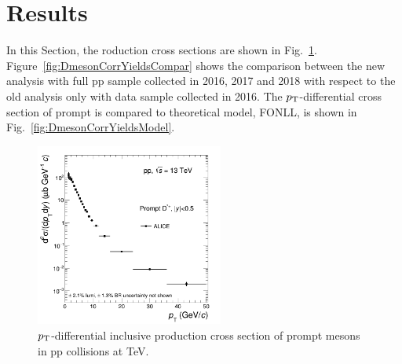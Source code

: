 \section{Results}


In this Section, the \Dstar roduction cross sections are shown in Fig.~\ref{fig:DmesonCorrYields}. Figure~\ref{fig:DmesonCorrYieldsCompar} shows the comparison between the new analysis with full pp sample collected in 2016, 2017 and 2018 with respect to the old analysis only with data sample collected in 2016. The $p_{\rm T}$-differential cross section of prompt \Dstar is compared to theoretical model, FONLL, is shown in Fig.~\ref{fig:DmesonCorrYieldsModel}.


\begin{figure}[tb]
\begin{center}
\includegraphics[width=0.55\textwidth]{figures/Dstar/pp13TeV/cross-setion-pp13TeV.png}
\caption{$p_{\rm T}$-differential inclusive production cross section of prompt \Dstar mesons in pp collisions at  TeV.} 
\label{fig:DmesonCorrYields}
\end{center}
\end{figure}



